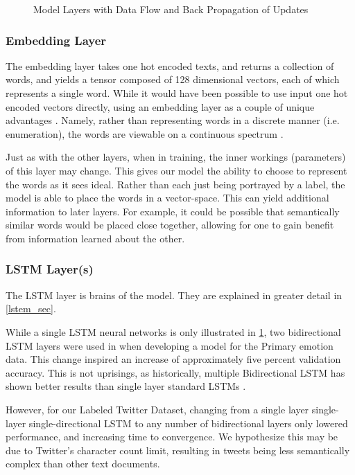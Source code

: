 \documentclass[titlepage,letterpaper]{article}
\begin{document}
\begin{figure}[h]
	\centering
	\caption{Model Layers with Data Flow and Back Propagation of Updates \cite{knisely}}
	\label{layers}
	\def\svgwidth{3.5in}
	
\end{figure}




\subsubsection{Embedding Layer}

The embedding layer takes one hot encoded texts, and returns a collection of words, and yields a tensor composed of 128 dimensional vectors, each of which represents a single word. While it would have been possible to use input one hot encoded vectors directly, using an embedding layer as a couple of unique advantages\cite{Keras.io} . Namely, rather than representing words in a discrete manner (i.e. enumeration), the words are viewable on a continuous spectrum \cite{dropout_embedding}.  

Just as with the other layers, when in training, the inner workings (parameters) of this layer may change. This gives our model the ability to choose to represent the words as it sees ideal. Rather than each just being portrayed by a label, the model is able to place the words in a vector-space. This can yield additional information to later layers. For example, it could be possible that semantically similar words would be placed close together, allowing for one to gain benefit from information learned about the other.\cite{dropout_embedding,embed}


 \subsubsection{LSTM Layer(s)}
The LSTM layer is brains of the model. They are explained in greater detail in \cref{lstem_sec}.

While a single LSTM neural networks is only illustrated in \cref{layers},  two bidirectional LSTM layers were used in when developing a model for the Primary emotion data. This change inspired an increase of approximately five percent validation accuracy.  This is not uprisings, as historically, multiple Bidirectional LSTM has shown better results than single layer standard LSTMs \cite{Keras.io,deep_bi}. 

However, for our Labeled Twitter Dataset, changing from a single layer single-layer single-directional LSTM to any number of bidirectional layers  only lowered performance,  and increasing time to convergence.  We hypothesize this may be due to Twitter's character count limit, resulting in tweets being less semantically complex than other text documents.
\end{document}
